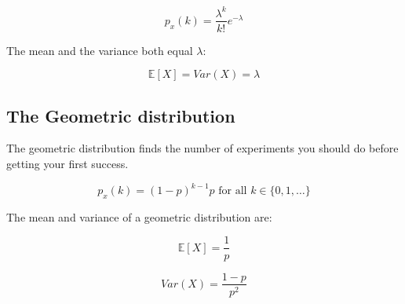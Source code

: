 \begin{dmath*}
	p_x(k) = \frac{\lambda^k}{k!}e^{-\lambda}
\end{dmath*}

The mean and the variance both equal $\lambda$:

\begin{dmath*}
	{\mathbb{E}[X] = Var(X) = \lambda}
\end{dmath*}

\subsection{The Geometric distribution}

The geometric distribution finds the number of experiments you should do before
getting your first success.

\begin{dmath*}
	p_x(k) = (1-p)^{k-1}p \textrm{ for all $k \in \{0, 1, \dots\}$}
\end{dmath*}

The mean and variance of a geometric distribution are:

\begin{dmath*}
	\mathbb{E}[X] = \frac{1}{p}
\end{dmath*}

\begin{dmath*}
	Var(X) = \frac{1-p}{p^2}
\end{dmath*}
